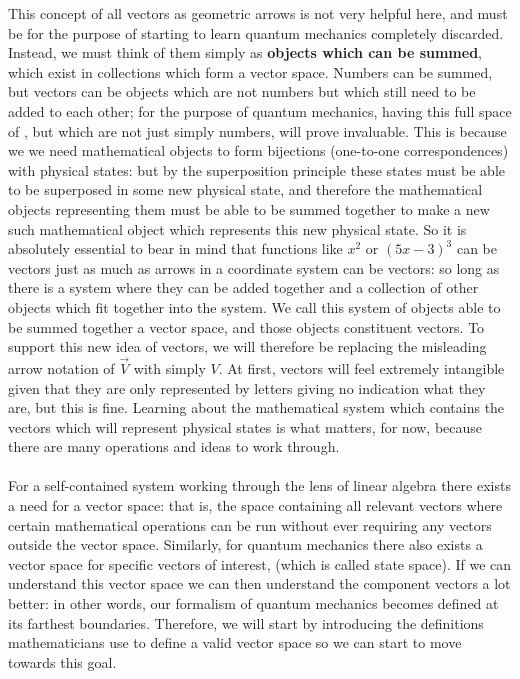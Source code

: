 This concept of all vectors as geometric arrows is not very helpful here, and must be for the purpose of starting to learn quantum mechanics completely discarded. Instead, we must think of them simply as \textbf{objects which can be summed}, which exist in collections which form a vector space. Numbers can be summed, but vectors can be objects which are not numbers but which still need to be added to each other; for the purpose of quantum mechanics, having this full space of , but which are not just simply numbers, will prove invaluable. This is because we we need mathematical objects to form bijections (one-to-one correspondences) with physical states: but by the superposition principle these states must be able to be superposed in some new physical state, and therefore the mathematical objects representing them must be able to be summed together to make a new such mathematical object which represents this new physical state. So it is absolutely essential to bear in mind that functions like $x^2$ or $(5x-3)^{3}$ can be vectors just as much as arrows in a coordinate system can be vectors: so long as there is a system where they can be added together and a collection of other objects which fit together into the system. We call this system of objects able to be summed together a vector space, and those objects constituent vectors. To support this new idea of vectors, we will therefore be replacing the misleading arrow notation of $\vec{V}$  with simply ${V}$. At first, vectors will feel extremely intangible given that they are only represented by letters giving no indication what they are, but this is fine. Learning about the mathematical system which contains the vectors which will represent physical states is what matters, for now, because there are many operations and ideas to work through.
\\\\
For a self-contained system working through the lens of linear algebra there exists a need for a vector space: that is, the space containing all relevant vectors where certain mathematical operations can be run without ever requiring any vectors outside the vector space. Similarly, for quantum mechanics there also exists a vector space for specific vectors of interest, (which is called state space). If we can understand this vector space we can then understand the component vectors a lot better: in other words, our formalism of quantum mechanics becomes defined at its farthest boundaries. Therefore, we will start by introducing the definitions mathematicians use to define a valid vector space so we can start to move towards this goal. 
